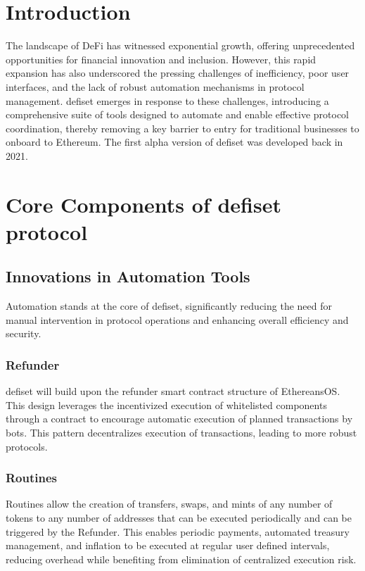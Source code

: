 \documentclass[11pt,oneside,a4paper]{article}
\begin{document}
\section{Introduction}
The landscape of DeFi has witnessed exponential growth, offering unprecedented opportunities for financial innovation and inclusion. However, this rapid expansion has also underscored the pressing challenges of inefficiency, poor user interfaces, and the lack of robust automation mechanisms in protocol management. defiset emerges in response to these challenges, introducing a comprehensive suite of tools designed to automate and enable effective protocol coordination, thereby removing a key barrier to entry for traditional businesses to onboard to Ethereum. The first alpha version of defiset was developed back in 2021.

\section{Core Components of defiset protocol}

\subsection{Innovations in Automation Tools}

Automation stands at the core of defiset, significantly reducing the need for manual intervention in protocol operations and enhancing overall efficiency and security.

\subsubsection{Refunder}
defiset will build upon the refunder smart contract structure of EthereansOS. This design leverages the incentivized execution of whitelisted components through a contract to encourage automatic execution of planned transactions by bots. This pattern decentralizes execution of transactions, leading to more robust protocols.

\subsubsection{Routines}
Routines allow the creation of transfers, swaps, and mints of any number of tokens to any number of addresses that can be executed periodically and can be triggered by the Refunder. This enables periodic payments, automated treasury management, and inflation to be executed at regular user defined intervals, reducing overhead while benefiting from elimination of centralized execution risk.
\end{document}
